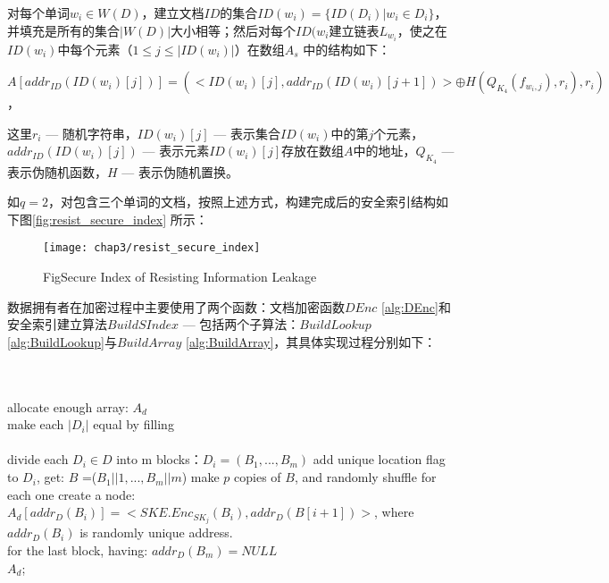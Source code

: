 对每个单词$w_i \in W(D)$，建立文档$ID$的集合$ID(w_i) = \{ID(D_i) | w_i \in D_i \}$，并填充是所有的集合$|W(D)|$大小相等；然后对每个$ID(w_i$建立链表$L_{w_i}$，使之在$ID(w_i)$中每个元素（$1 \leq j \leq |ID(w_i)|$）在数组$A_s$ 中的结构如下：
\begin{center}
$A[addr_{ID}(ID(w_i)[j])] = (<ID(w_i)[j], addr_{ID}(ID(w_i)[j+1])> \oplus H(Q_{K_4}(f_{w_i,j}),r_i), r_i)$，
\end{center}
这里$r_i$ --- 随机字符串，$ID(w_i)[j]$ --- 表示集合$ID(w_i)$中的第$j$个元素，$addr_{ID}(ID(w_i)[j])$ --- 表示元素$ID(w_i)[j]$存放在数组$A$中的地址，$Q_{K_4}$ --- 表示伪随机函数，$H$ --- 表示伪随机置换。

如$q = 2$，对包含三个单词的文档，按照上述方式，构建完成后的安全索引结构如下图\ref{fig:resist_secure_index} 所示：
\begin{figure}[!htp]
  \centering
  \texttt{[image: chap3/resist\_secure\_index]}

   {Fig}{Secure Index of Resisting Information Leakage}
\end{figure}

数据拥有者在加密过程中主要使用了两个函数：文档加密函数$DEnc$ \ref{alg:DEnc}和安全索引建立算法$BuildSIndex$ --- 包括两个子算法：$BuildLookup$ \ref{alg:BuildLookup}与$BuildArray$ \ref{alg:BuildArray}，其具体实现过程分别如下：

\begin{algorithm}[!htb]
\caption{$A_d \leftarrow DEnc(D, K)$}
\label{alg:DEnc}
\begin{algorithmic} [1]

\ENSURE ~~\\
   ~~\\
         allocate enough array: $A_d$ ~~\\
         make each $|D_i|$ equal by filling ~~\\
   ~~\\
  \STATE divide each $D_i \in D$ into m blocks：$D_i = (B_1, ..., B_m)$
  \STATE add unique location flag to $D_i$, get: $B$ =($B_1||1, ..., B_m||m$)
  \STATE make $p$ copies of $B$, and randomly shuffle for each one 
              \STATE create a node: $A_d[addr_D(B_i)] = < SKE.Enc_{SK_j}(B_i), addr_D(B[i+1]) >$,
                     where $addr_D(B_i)$ is randomly unique address. ~~\\
                     for the last block, having: $addr_D(B_m) = NULL$ ~~\\
           \ENDFOR
         \ENDFOR
  \RETURN ${A_d}$;

\end{algorithmic}
\end{algorithm}

